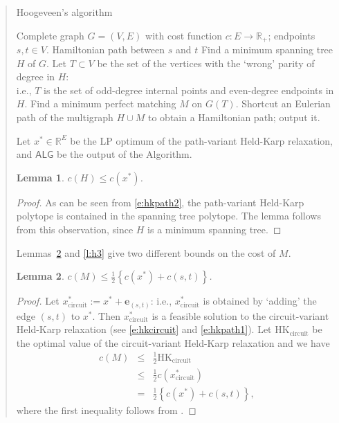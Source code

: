 \documentclass[11pt,letterpaper]{article}
\newtheorem{lemma}{Lemma}
\begin{document}
\begin{quote}
\begin{algorithm}[H]
\caption{Hoogeveen's algorithm \cite{H}}
\label{a:hoogeveen}
\begin{algorithmic}[1]
	\REQUIRE Complete graph $G=(V,E)$ with cost function $c:E\to\mathbb{R}_+$; endpoints $s,t\in V$.
	\ENSURE Hamiltonian path between $s$ and $t$
	\STATE Find a minimum spanning tree $H$ of $G$.
	\STATE Let $T\subset V$ be the set of the vertices with the `wrong' parity of degree in $H$:\\i.e., $T$ is the set of odd-degree internal points and even-degree endpoints in $H$.
	\STATE Find a minimum perfect matching $M$ on $G(T)$.
	\STATE Shortcut an Eulerian path of the multigraph $H\cup M$ to obtain a Hamiltonian path; output it.
\end{algorithmic}
\end{algorithm}

Let $x^*\in\mathbb{R}^E$ be the LP optimum of the path-variant Held-Karp relaxation, and $\mathsf{ALG}$ be the output of the Algorithm.

\begin{lemma}
\label{l:h1}
$c(H)\leq c(x^*)$.
\end{lemma}
\begin{proof}
As can be seen from \eqref{e:hkpath2}, the path-variant Held-Karp polytope is contained in the spanning tree polytope. The lemma follows from this observation, since $H$ is a minimum spanning tree.
\end{proof}

Lemmas~\ref{l:h2} and \ref{l:h3} give two different bounds on the cost of $M$.

\begin{lemma}
\label{l:h2}
$c(M)\leq \frac{1}{2}\left\{c(x^*)+c(s,t)\right\}$.
\end{lemma}
\begin{proof}
Let $x^*_{\mathrm{circuit}} := x^*+\mathbf{e}_{(s,t)}$: i.e., $x^*_{\mathrm{circuit}}$ is obtained by `adding' the edge $(s,t)$ to $x^*$. Then $x^*_{\mathrm{circuit}}$ is a feasible solution to the circuit-variant Held-Karp relaxation (see \eqref{e:hkcircuit} and \eqref{e:hkpath1}). Let $\mathrm{HK_{circuit}}$ be the optimal value of the circuit-variant Held-Karp relaxation and we have\begin{eqnarray*}
c(M)&\leq& \frac{1}{2}\mathrm{HK_{circuit}}\\
& \leq& \frac{1}{2} c(x^*_{\mathrm{circuit}})\\
& =& \frac{1}{2} \left\{ c(x^*)+c(s,t) \right\}
,\end{eqnarray*}where the first inequality follows from \cite{W, SW}.
\end{proof}


\end{quote}
\end{document}
